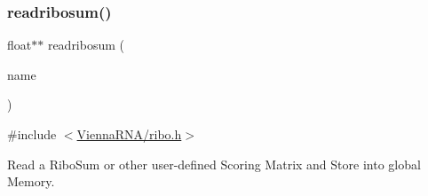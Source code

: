 \subsubsection{\texorpdfstring{readribosum()}{readribosum()}}
{\footnotesize\ttfamily float$\ast$$\ast$ readribosum (\begin{DoxyParamCaption}\item[{char $\ast$}]{name }\end{DoxyParamCaption})}



{\ttfamily \#include $<$\mbox{\hyperlink{ribo_8h}{Vienna\+R\+N\+A/ribo.\+h}}$>$}



Read a Ribo\+Sum or other user-\/defined Scoring Matrix and Store into global Memory. 

